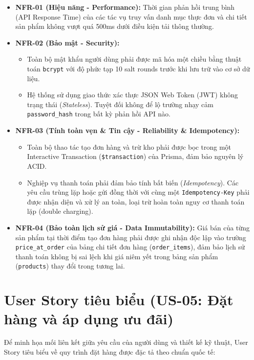 \documentclass[12pt,a4paper,oneside]{report}
\begin{document}
\begin{itemize}
    \item \textbf{NFR-01 (Hiệu năng - Performance):} Thời gian phản hồi trung bình (API Response Time) của các tác vụ truy vấn danh mục thực đơn và chi tiết sản phẩm không vượt quá 500ms dưới điều kiện tải thông thường.
    \item \textbf{NFR-02 (Bảo mật - Security):} 
    \begin{itemize}
        \item Toàn bộ mật khẩu người dùng phải được mã hóa một chiều bằng thuật toán \texttt{bcrypt} với độ phức tạp 10 salt rounds trước khi lưu trữ vào cơ sở dữ liệu.
        \item Hệ thống sử dụng giao thức xác thực JSON Web Token (JWT) không trạng thái (\textit{Stateless}). Tuyệt đối không để lộ trường nhạy cảm \texttt{password\_hash} trong bất kỳ phản hồi API nào.
    \end{itemize}
    \item \textbf{NFR-03 (Tính toàn vẹn \& Tin cậy - Reliability \& Idempotency):}
    \begin{itemize}
        \item Toàn bộ thao tác tạo đơn hàng và trừ kho phải được bọc trong một Interactive Transaction (\texttt{\$transaction}) của Prisma, đảm bảo nguyên lý ACID.
        \item Nghiệp vụ thanh toán phải đảm bảo tính bất biến (\textit{Idempotency}). Các yêu cầu trùng lặp hoặc gửi đồng thời với cùng một \texttt{Idempotency-Key} phải được nhận diện và xử lý an toàn, loại trừ hoàn toàn nguy cơ thanh toán lặp (double charging).
    \end{itemize}
    \item \textbf{NFR-04 (Bảo toàn lịch sử giá - Data Immutability):} Giá bán của từng sản phẩm tại thời điểm tạo đơn hàng phải được ghi nhận độc lập vào trường \texttt{price\_at\_order} của bảng chi tiết đơn hàng (\texttt{order\_items}), đảm bảo lịch sử thanh toán không bị sai lệch khi giá niêm yết trong bảng sản phẩm (\texttt{products}) thay đổi trong tương lai.
\end{itemize}

\section{User Story tiêu biểu (US-05: Đặt hàng và áp dụng ưu đãi)}
Để minh họa mối liên kết giữa yêu cầu của người dùng và thiết kế kỹ thuật, User Story tiêu biểu về quy trình đặt hàng được đặc tả theo chuẩn quốc tế:
\end{document}
